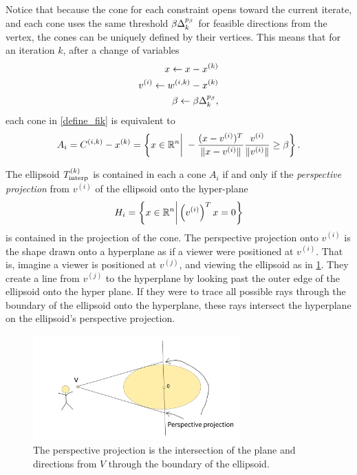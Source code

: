 Notice that because the cone for each constraint opens toward the current iterate,
and each cone uses the same threshold $\beta \Delta_k^{p_\beta}$ for feasible directions from the vertex,
the cones can be uniquely defined by their vertices.
This means that for an iteration $k$, after a change of variables
\begin{align}
x \gets x - x^{(k)} \\
v^{(i)}  \gets {w^{(i, k)}} - x^{(k)} \\
\beta \gets \beta \Delta_k^{p_{\beta}},
\end{align}
each cone in \cref{define_fik} is equivalent to
\begin{align*}
A_i = {C^{(i, k)}} - x^{(k)} = \left\{x\in\mathbb R^n\bigg|\;-\frac{(x - v^{(i)})^T}{\|x - v^{(i)}\|} \frac{v^{(i)}}{\|v^{(i)}\|} \ge \beta \right\}.
\end{align*}


The ellipsoid ${T_{\text{interp}}^{(k)}}$ is contained in each a cone $A_i$ if and only if the \emph{perspective projection} from $v^{(i)}$ of the ellipsoid onto the hyper-plane 
\begin{align*}
H_i = \left\{x \in \mathbb R^n \bigg|\left(v^{(i)}\right)^Tx = 0\right\}
\end{align*}
is contained in the projection of the cone.   
The perspective projection onto $v^{(i)}$ is the shape drawn onto a hyperplane as if a viewer were positioned at $v^{(i)}$.
That is, imagine a viewer is positioned at $v^{(j)}$, and viewing the ellipsoid as in \cref{perspective_projection_depiction}.
They create a line from $v^{(j)}$ to the hyperplane by looking past the outer edge of the ellipsoid onto the hyper plane.
If they were to trace all possible rays through the boundary of the ellipsoid onto the hyperplane, 
these rays intersect the hyperplane on the ellipsoid's perspective projection.  


\begin{figure}[ht]
    \centering
    \includegraphics[width=300px]{images/perspective_projection.png}
    \caption[A depiction of the perspective projection]{
    		The perspective projection is the intersection of the plane and directions from $V$ through the boundary of the ellipsoid.
	}
    \label{perspective_projection_depiction}
\end{figure}

